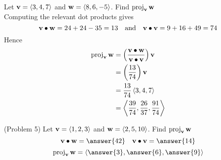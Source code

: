 \documentclass[handout]{ximera}
\begin{document}
\begin{example}[Example 5]
Let $\mathbf v = \left\langle 3,4,7\right\rangle$ and $\mathbf w = \left\langle 8,6,-5\right\rangle$. Find $\operatorname{proj}_{\mathbf{v}} \mathbf{w}$\\
Computing the relevant dot products gives
\[
\mathbf v \bullet \mathbf w = 24+24 -35 = 13 \quad \text{and} \quad \mathbf v \bullet \mathbf v =9 + 16+49 = 74
\]
Hence
\begin{align*}
\operatorname{proj}_{\mathbf{v}} \mathbf{w} &= \left(\frac{\mathbf{v} \bullet \mathbf{w}}{\mathbf{v} \bullet \mathbf{v}}\right) \mathbf{v}\\
                        &= \left(\frac{13}{74}\right) \mathbf v\\
                        &= \frac{13}{74} \left\langle 3,4,7\right\rangle\\
                        &= \left\langle \frac{39}{74},\frac{26}{37},\frac{91}{74}\right\rangle
\end{align*}
\end{example}

\begin{problem}(Problem 5)
Let $\mathbf v = \left\langle 1,2,3\right\rangle$ and $\mathbf w = \left\langle 2,5,10\right\rangle$. Find $\operatorname{proj}_{\mathbf{v}} \mathbf{w}$\\
\[
\vec v \dotp \vec w = \answer{42} \quad \vec v \dotp \vec v = \answer{14} 
\]
\[
 \proj_{\vec{v}} \vec{w} = \vector{\answer{3},\answer{6},\answer{9}}
\]
\end{problem}
\end{document}
